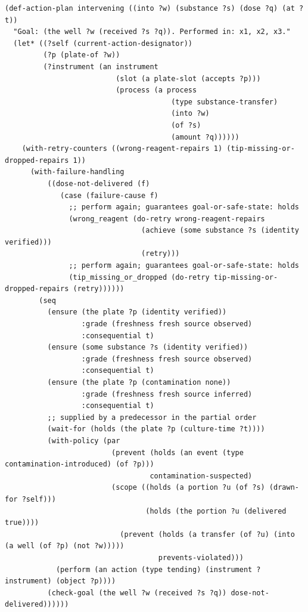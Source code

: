 \documentclass[10pt,a4paper]{article}
\begin{document}
\begin{listing}[tbp]
\begin{Verbatim}[fontsize=\footnotesize,breaklines,frame=lines,framesep=2mm]
(def-action-plan intervening ((into ?w) (substance ?s) (dose ?q) (at ?t))
  "Goal: (the well ?w (received ?s ?q)). Performed in: x1, x2, x3."
  (let* ((?self (current-action-designator))
         (?p (plate-of ?w))
         (?instrument (an instrument
                          (slot (a plate-slot (accepts ?p)))
                          (process (a process
                                       (type substance-transfer)
                                       (into ?w)
                                       (of ?s)
                                       (amount ?q))))))
    (with-retry-counters ((wrong-reagent-repairs 1) (tip-missing-or-dropped-repairs 1))
      (with-failure-handling
          ((dose-not-delivered (f)
             (case (failure-cause f)
               ;; perform again; guarantees goal-or-safe-state: holds
               (wrong_reagent (do-retry wrong-reagent-repairs
                                (achieve (some substance ?s (identity verified)))
                                (retry)))
               ;; perform again; guarantees goal-or-safe-state: holds
               (tip_missing_or_dropped (do-retry tip-missing-or-dropped-repairs (retry))))))
        (seq
          (ensure (the plate ?p (identity verified))
                  :grade (freshness fresh source observed)
                  :consequential t)
          (ensure (some substance ?s (identity verified))
                  :grade (freshness fresh source observed)
                  :consequential t)
          (ensure (the plate ?p (contamination none))
                  :grade (freshness fresh source inferred)
                  :consequential t)
          ;; supplied by a predecessor in the partial order
          (wait-for (holds (the plate ?p (culture-time ?t))))
          (with-policy (par
                         (prevent (holds (an event (type contamination-introduced) (of ?p)))
                                  contamination-suspected)
                         (scope ((holds (a portion ?u (of ?s) (drawn-for ?self)))
                                 (holds (the portion ?u (delivered true))))
                           (prevent (holds (a transfer (of ?u) (into (a well (of ?p) (not ?w)))))
                                    prevents-violated)))
            (perform (an action (type tending) (instrument ?instrument) (object ?p))))
          (check-goal (the well ?w (received ?s ?q)) dose-not-delivered))))))
\end{Verbatim}
\caption{Generated CRAM/RPL action plan for the intervening type (excerpt).}\label{lst:cram}
\end{listing}
\end{document}
